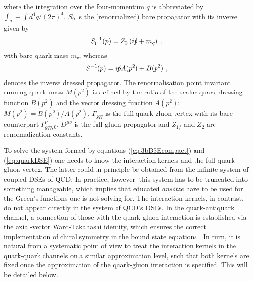 %
where the integration over the four-momentum $q$ is abbreviated by
$\int_q \equiv \int d^4 q/ {(2\pi)^4}$, $S_0$ is the (renormalized) 
bare propagator with its inverse given by
%
\begin{equation}\label{eq:bare_prop}
 S^{-1}_0(p)=Z_2\left(i\Slash{p}+m_q\right)\,\,,
\end{equation}
%
with bare quark mass $m_q$, whereas  
\begin{equation}\label{eq:prop}
 S^{-1}(p)=i\Slash{p} A(p^2) + B(p^2)\,\,,
\end{equation}
denotes the inverse dressed propagator. The renormalisation point invariant 
running quark mass $M(p^2)$ is defined by the ratio of the scalar 
quark dressing function $B(p^2)$ and the vector dressing function 
$A(p^2)$: $M(p^2) = B(p^2)/A(p^2)$.
$\Gamma^\nu_{gqq}$ is the full quark-gluon vertex with 
its bare counterpart $\Gamma^\nu_{gqq,0}$, $D^{\mu\nu}$ is the full
gluon propagator and $Z_{1f}$ and $Z_2$ are renormalization constants. 


To solve the system formed by equations (\ref{eq:3bBSEcompact}) and (\ref{eq:quarkDSE}) one needs to know the interaction kernels and the full quark-gluon vertex. The latter could in principle be obtained from the infinite system of coupled DSEs of QCD. In practice, however, this system has to be truncated into something manageable, which implies that educated \textit{ans\"atze} have to be used for the Green's functions one is not solving for. The interaction kernels, in contrast, do not appear directly in the system of QCD's DSEs. 
In the quark-antiquark channel, a connection of those with the quark-gluon interaction is established
via the axial-vector Ward-Takahashi identity, which ensures the correct implementation of chiral 
symmetry in the bound state equations \cite{Munczek:1994zz,Maris:1997hd}. In turn, it is natural from
a systematic point of view to treat the interaction kernels in the quark-quark channels on a similar
approximation level, such that both kernels are fixed once the approximation of the
quark-gluon interaction is specified. This will be detailed below.


